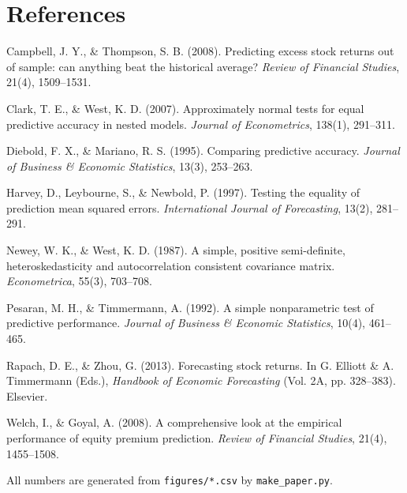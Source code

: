 \documentclass[11pt,a4paper]{article}
\begin{document}
\section*{References}
{\small
\setlength{\parskip}{2pt}
\hangindent=1.27cm Campbell, J. Y., \& Thompson, S. B. (2008). Predicting excess stock returns out of sample: can anything beat the historical average?
\textit{Review of Financial Studies}, 21(4), 1509--1531.\par
\hangindent=1.27cm Clark, T. E., \& West, K. D. (2007). Approximately normal tests for equal predictive accuracy in nested models. \textit{Journal of
Econometrics}, 138(1), 291--311.\par
\hangindent=1.27cm Diebold, F. X., \& Mariano, R. S. (1995). Comparing predictive accuracy. \textit{Journal of Business \& Economic Statistics}, 13(3),
253--263.\par
\hangindent=1.27cm Harvey, D., Leybourne, S., \& Newbold, P. (1997). Testing the equality of prediction mean squared errors. \textit{International
Journal of Forecasting}, 13(2), 281--291.\par
\hangindent=1.27cm Newey, W. K., \& West, K. D. (1987). A simple, positive semi-definite, heteroskedasticity and autocorrelation consistent covariance
matrix. \textit{Econometrica}, 55(3), 703--708.\par
\hangindent=1.27cm Pesaran, M. H., \& Timmermann, A. (1992). A simple nonparametric test of predictive performance. \textit{Journal of Business \&
Economic Statistics}, 10(4), 461--465.\par
\hangindent=1.27cm Rapach, D. E., \& Zhou, G. (2013). Forecasting stock returns. In G. Elliott \& A. Timmermann (Eds.), \textit{Handbook of Economic
Forecasting} (Vol. 2A, pp. 328--383). Elsevier.\par
\hangindent=1.27cm Welch, I., \& Goyal, A. (2008). A comprehensive look at the empirical performance of equity premium prediction. \textit{Review of
Financial Studies}, 21(4), 1455--1508.\par

\smallskip
All numbers are generated from
\texttt{figures/*.csv} by \texttt{make\_paper.py}.
}
\end{document}
